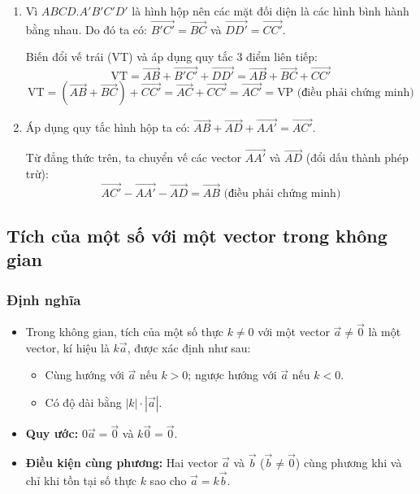 \documentclass[12pt]{article}
\begin{document}
	\begin{loigiai}
		\begin{enumerate}[label=\alph*)]
			\item Vì $ABCD.A'B'C'D'$ là hình hộp nên các mặt đối diện là các hình bình hành bằng nhau. Do đó ta có:
			$\overrightarrow{B'C'} = \overrightarrow{BC}$ và $\overrightarrow{DD'} = \overrightarrow{CC'}$.
			
			Biến đổi vế trái (VT) và áp dụng quy tắc 3 điểm liên tiếp:
			$$ \text{VT} = \overrightarrow{AB} + \overrightarrow{B'C'} + \overrightarrow{DD'} = \overrightarrow{AB} + \overrightarrow{BC} + \overrightarrow{CC'} $$
			$$ \text{VT} = (\overrightarrow{AB} + \overrightarrow{BC}) + \overrightarrow{CC'} = \overrightarrow{AC} + \overrightarrow{CC'} = \overrightarrow{AC'} = \text{VP} \text{ (điều phải chứng minh)} $$
			
			\item Áp dụng quy tắc hình hộp ta có: $\overrightarrow{AB} + \overrightarrow{AD} + \overrightarrow{AA'} = \overrightarrow{AC'}$.
			
			Từ đẳng thức trên, ta chuyển vế các vector $\overrightarrow{AA'}$ và $\overrightarrow{AD}$ (đổi dấu thành phép trừ):
			$$ \overrightarrow{AC'} - \overrightarrow{AA'} - \overrightarrow{AD} = \overrightarrow{AB} \text{ (điều phải chứng minh)} $$
		\end{enumerate}
	\end{loigiai}
	
	
	
	\subsection{Tích của một số với một vector trong không gian}
	
	\subsubsection{Định nghĩa}
	\begin{itemize}
		\item Trong không gian, tích của một số thực $k \neq 0$ với một vector $\vec{a} \neq \vec{0}$ là một vector, kí hiệu là $k\vec{a}$, được xác định như sau:
		\begin{itemize}
			\item Cùng hướng với $\vec{a}$ nếu $k > 0$; ngược hướng với $\vec{a}$ nếu $k < 0$.
			\item Có độ dài bằng $|k| \cdot |\vec{a}|$.
		\end{itemize}
		\item \textbf{Quy ước:} $0\vec{a} = \vec{0}$ và $k\vec{0} = \vec{0}$.
		\item \textbf{Điều kiện cùng phương:} Hai vector $\vec{a}$ và $\vec{b}$ ($\vec{b} \neq \vec{0}$) cùng phương khi và chỉ khi tồn tại số thực $k$ sao cho $\vec{a} = k\vec{b}$.
	\end{itemize}
	
\end{document}
